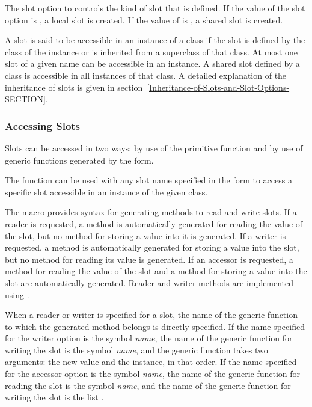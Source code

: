 The  slot option to  controls the kind
of slot that is defined.  If the value of the  slot
option is , a local slot is created.  If the value of
 is , a shared slot is created.

A slot is said to be {\bit accessible\/} in an instance of a class if
the slot is defined by the class of the instance or is inherited from
a superclass of that class.  At most one slot of a given name can be
accessible in an instance.  A shared slot defined by a class is
accessible in all instances of that class.  A detailed explanation of
the inheritance of slots is given in
section~\ref{Inheritance-of-Slots-and-Slot-Options-SECTION}.

\subsubsection{Accessing Slots}

Slots can be accessed in two ways: by use of the primitive function
 and by use of generic functions generated by the 
 form.

The function  can be used with any slot name
specified in the  form to access a specific slot
accessible in an instance of the given class.

The macro  provides syntax for generating methods to
read and write slots.  If a {\bit reader\/} is requested, a method is
automatically generated for reading the value of the slot, but no
method for storing a value into it is generated.  If a {\bit writer\/}
is requested, a method is automatically generated for storing a value
into the slot, but no method for reading its value is generated.  If
an {\bit accessor\/} is requested, a method for reading the value of
the slot and a method for storing a value into the slot are
automatically generated.  Reader and writer methods are implemented
using .

When a reader or writer is specified for a slot, the name of the
generic function to which the generated method belongs is directly
specified.  If the name specified for the writer option is the symbol
\emph{name}, the name of the generic function for writing the slot
is the symbol \emph{name}, and the generic function takes two
arguments: the new value and the instance, in that order.  If the name
specified for the accessor option is the symbol \emph{name}, the
name of the generic function for reading the slot is the symbol {\it
name\/}, and the name of the generic function for writing the slot is
the list .


